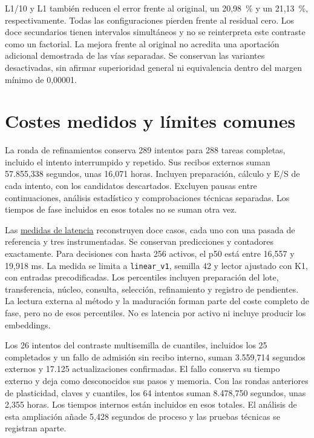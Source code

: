 \documentclass[11pt,a4paper]{report}
\begin{document}
L1/10 y L1 también reducen el error frente al original, un 20,98~\% y un
21,13~\%, respectivamente. Todas las configuraciones pierden frente al
residual cero. Los doce secundarios tienen intervalos simultáneos y no se
reinterpreta este contraste como un factorial. La mejora frente al original
no acredita una aportación adicional demostrada de las vías separadas.
Se conservan las variantes desactivadas, sin afirmar superioridad general
ni equivalencia dentro del margen mínimo de 0,00001.

\section{Costes medidos y límites comunes}
La ronda de refinamientos conserva 289 intentos para 288 tareas completas,
incluido el intento interrumpido y repetido. Sus recibos externos suman
57.855,338 segundos, unas 16,071 horas. Incluyen preparación, cálculo y E/S
de cada intento, con los candidatos descartados. Excluyen pausas entre
continuaciones, análisis estadístico y comprobaciones técnicas separadas.
Los tiempos de fase incluidos en esos totales no se suman otra vez.

Las \href{https://github.com/GonxKZ/mars-titan/blob/8b7e2a5600be568cc1299f2a661da15b5090c45e/reports/engineering/refinement-selected-latency-20261019/README.md}{medidas de latencia}
reconstruyen doce casos, cada uno con una pasada de referencia y tres
instrumentadas. Se conservan predicciones y contadores exactamente. Para
decisiones con hasta 256 activos, el p50 está entre 16,557 y 19,918 ms.
La medida se limita a \texttt{linear\_v1}, semilla 42 y lector ajustado con K1,
con entradas precodificadas. Los percentiles incluyen preparación del lote,
transferencia, núcleo, consulta, selección, refinamiento y registro de
pendientes. La lectura externa al método y la maduración forman parte del
coste completo de fase, pero no de esos percentiles. No es latencia por activo
ni incluye producir los embeddings.

Los 26 intentos del contraste multisemilla de cuantiles, incluidos los
25 completados y un fallo de admisión sin recibo interno, suman
3.559,714 segundos externos y 17.125 actualizaciones confirmadas. El fallo
conserva su tiempo externo y deja como desconocidos sus pasos y memoria.
Con las rondas anteriores de plasticidad, claves y cuantiles, los 64 intentos
suman 8.478,750 segundos, unas 2,355 horas. Los tiempos internos están
incluidos en esos totales. El análisis de esta ampliación añade
5,428 segundos de proceso y las pruebas técnicas se registran aparte.
\end{document}
